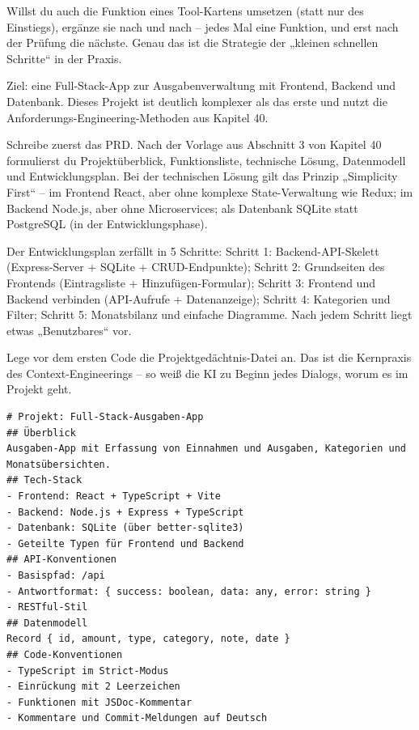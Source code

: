 Willst du auch die Funktion eines Tool-Kartens umsetzen (statt nur des Einstiegs), ergänze sie nach und nach – jedes Mal eine Funktion, und erst nach der Prüfung die nächste. Genau das ist die Strategie der „kleinen schnellen Schritte“ in der Praxis.



Ziel: eine Full-Stack-App zur Ausgabenverwaltung mit Frontend, Backend und Datenbank. Dieses Projekt ist deutlich komplexer als das erste und nutzt die Anforderungs-Engineering-Methoden aus Kapitel 40.

Schreibe zuerst das PRD. Nach der Vorlage aus Abschnitt 3 von Kapitel 40 formulierst du Projektüberblick, Funktionsliste, technische Lösung, Datenmodell und Entwicklungsplan. Bei der technischen Lösung gilt das Prinzip „Simplicity First“ – im Frontend React, aber ohne komplexe State-Verwaltung wie Redux; im Backend Node.js, aber ohne Microservices; als Datenbank SQLite statt PostgreSQL (in der Entwicklungsphase).

Der Entwicklungsplan zerfällt in 5 Schritte: Schritt 1: Backend-API-Skelett (Express-Server + SQLite + CRUD-Endpunkte); Schritt 2: Grundseiten des Frontends (Eintragsliste + Hinzufügen-Formular); Schritt 3: Frontend und Backend verbinden (API-Aufrufe + Datenanzeige); Schritt 4: Kategorien und Filter; Schritt 5: Monatsbilanz und einfache Diagramme. Nach jedem Schritt liegt etwas „Benutzbares“ vor.


Lege vor dem ersten Code die Projektgedächtnis-Datei an. Das ist die Kernpraxis des Context-Engineerings – so weiß die KI zu Beginn jedes Dialogs, worum es im Projekt geht.

\begin{lstlisting}
# Projekt: Full-Stack-Ausgaben-App
## Überblick
Ausgaben-App mit Erfassung von Einnahmen und Ausgaben, Kategorien und Monatsübersichten.
## Tech-Stack
- Frontend: React + TypeScript + Vite
- Backend: Node.js + Express + TypeScript
- Datenbank: SQLite (über better-sqlite3)
- Geteilte Typen für Frontend und Backend
## API-Konventionen
- Basispfad: /api
- Antwortformat: { success: boolean, data: any, error: string }
- RESTful-Stil
## Datenmodell
Record { id, amount, type, category, note, date }
## Code-Konventionen
- TypeScript im Strict-Modus
- Einrückung mit 2 Leerzeichen
- Funktionen mit JSDoc-Kommentar
- Kommentare und Commit-Meldungen auf Deutsch
\end{lstlisting}

